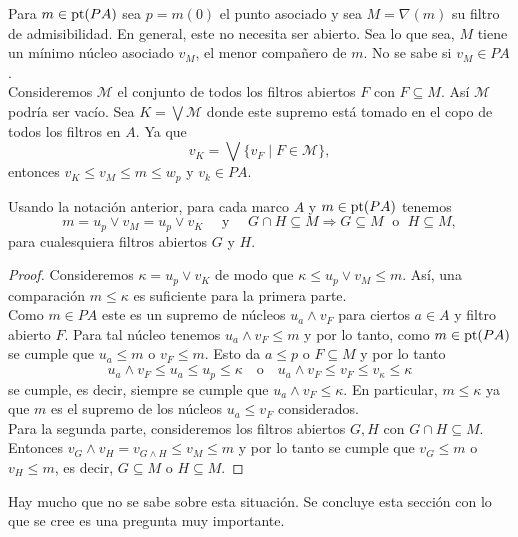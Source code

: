 Para $m\in\mathrm{pt}(PA)$ sea $p=m(0)$ el punto asociado y sea $M=\nabla(m)$ su filtro de admisibilidad. En general, este no necesita ser abierto. Sea lo que sea, $M$ tiene un mínimo núcleo asociado $v_M$, el menor compañero de $m$. No se sabe si $v_M\in PA$.\\

Consideremos $\mathcal{M}$ el conjunto de todos los filtros abiertos $F$ con $F\subseteq M$. Así $\mathcal{M}$ podría ser vacío. Sea $K=\bigvee \mathcal{M}$ donde este supremo está tomado en el copo de todos los filtros en $A$. Ya que
\[
v_K=\bigvee\{v_F\mid F\in \mathcal{M}\},
\]
entonces $v_K\leq v_M\leq m\leq w_p$ y $v_k\in PA$.

\begin{lem}
    Usando la notación anterior, para cada marco $A$ y $m\in \mathrm{pt}(PA)$ tenemos 
    \[
    m=u_p\vee v_M=u_p\vee v_K\quad\mbox{ y }\quad G\cap H\subseteq M\Rightarrow G\subseteq M\; \mbox{ o }\; H\subseteq M,
    \]
    para cualesquiera filtros abiertos $G$ y $H$.
\end{lem}

\begin{proof}
    Consideremos $\kappa=u_p\vee v_K$ de modo que $\kappa\leq u_p\vee v_M\leq m$. Así, una comparación $m\leq \kappa$ es suficiente para la primera parte.\\

    Como $m\in PA$ este es un supremo de núcleos $u_a\wedge v_F$ para ciertos $a\in A$ y filtro abierto $F$. Para tal núcleo tenemos $u_a\wedge v_F\leq m$ y por lo tanto, como $m\in \mathrm{pt}(PA)$ se cumple que $u_a\leq m$ o $v_F\leq m$. Esto da $a\leq p$ o $F\subseteq M$ y por lo tanto 
    \[
    u_a\wedge v_F\leq u_a\leq u_p\leq \kappa \quad \mbox{o}\quad u_a\wedge v_F\leq v_F\leq v_\kappa\leq \kappa
    \]
    se cumple, es decir, siempre se cumple que $u_a\wedge v_F\leq \kappa$. En particular, $m\leq \kappa$ ya que $m$ es el supremo de los núcleos $u_a\leq v_F$ considerados.\\

    Para la segunda parte, consideremos los filtros abiertos $G, H$ con $G\cap H\subseteq M$. Entonces $v_G\wedge v_H=v_{G\wedge H}\leq v_M\leq m$ y por lo tanto se cumple que $v_G\leq m$ o $v_H\leq m$, es decir, $G\subseteq M$ o $H\subseteq M$.
\end{proof}

Hay mucho que no se sabe sobre esta situación. Se concluye esta sección con lo que se cree es una pregunta muy importante.\\

